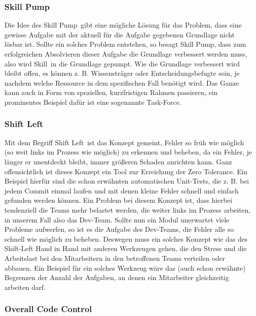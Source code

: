 \subsubsection*{Skill Pump}

Die Idee des \glqq Skill Pump\grqq\ gibt eine mögliche Lösung für das Problem, dass eine gewisse Aufgabe mit der aktuell für die Aufgabe gegebenen Grundlage nicht lösbar ist. Sollte ein solches Problem entstehen, so besagt Skill Pump, dass zum erfolgreichen Absolvieren dieser Aufgabe die Grundlage verbessert werden muss, also wird \glqq Skill\grqq\ in die Grundlage \glqq gepumpt\grqq . Wie die Grundlage verbessert wird bleibt offen, es können z. B. Wissensträger oder Entscheidungsbefugte sein, je nachdem welche Ressource in dem spezifischen Fall benötigt wird. Das Ganze kann auch in Form von speziellen, kurzfristigen Rahmen passieren, ein prominentes Beispiel dafür ist eine sogenannte \glqq Task-Force\grqq .

\subsubsection*{Shift Left}

Mit dem Begriff \glqq Shift Left\grqq\ ist das Konzept gemeint, Fehler so früh wie möglich (so weit links im Prozess wie möglich) zu erkennen und beheben, da ein Fehler, je länger er unentdeckt bleibt, immer größeren Schaden anrichten kann. Ganz offensichtlich ist dieses Konzept ein Tool zur Erreichung der Zero Tolerance. Ein Beispiel hierfür sind die schon erwähnten automatischen Unit-Tests, die z. B. bei jedem Commit einmal laufen und mit denen kleine Fehler schnell und einfach gefunden werden können. Ein Problem bei diesem Konzept ist, dass hierbei tendenziell die Teams mehr belastet werden, die weiter links im Prozess arbeiten, in unserem Fall also das Dev-Team. Sollte nun ein Modul unerwartet viele Probleme aufwerfen, so ist es die Aufgabe des Dev-Teams, die Fehler alle so schnell wie möglich zu beheben. Deswegen muss ein solches Konzept wie das des Shift-Left Hand in Hand mit anderen Werkzeugen gehen, die den Stress und die Arbeitslast bei den Mitarbeitern in den betroffenen Teams verteilen oder abbauen. Ein Beispiel für ein solches Werkzeug wäre das (auch schon erwähnte) Begrenzen der Anzahl der Aufgaben, an denen ein Mitarbeiter gleichzeitig arbeiten darf.

\subsubsection*{Overall Code Control}
 

